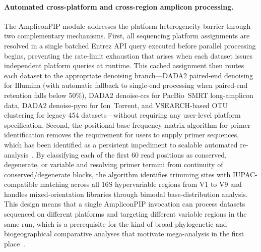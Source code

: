 \paragraph{Automated cross-platform and cross-region amplicon processing.}
The AmpliconPIP module addresses the platform heterogeneity barrier through two
complementary mechanisms.
First, all sequencing platform assignments are resolved in a single batched Entrez
API query executed before parallel processing begins, preventing the rate-limit
exhaustion that arises when each dataset issues independent platform queries at
runtime.
This cached assignment then routes each dataset to the appropriate denoising
branch---DADA2 paired-end denoising for Illumina (with automatic fallback to
single-end processing when paired-end retention falls below 50\%), DADA2 denoise-ccs
for PacBio~SMRT long-amplicon data, DADA2 denoise-pyro for Ion~Torrent, and
VSEARCH-based OTU clustering for legacy 454 datasets---without requiring any
user-level platform specification.
Second, the positional base-frequency matrix algorithm for primer identification
removes the requirement for users to supply primer sequences, which has been
identified as a persistent impediment to scalable automated re-analysis~\citep{regueira2023critical}.
By classifying each of the first 60 read positions as conserved, degenerate, or
variable and resolving primer termini from continuity of conserved/degenerate blocks,
the algorithm identifies trimming sites with IUPAC-compatible matching across all 16S
hypervariable regions from V1 to V9 and handles mixed-orientation libraries through
bimodal base-distribution analysis.
This design means that a single AmpliconPIP invocation can process datasets sequenced
on different platforms and targeting different variable regions in the same run,
which is a prerequisite for the kind of broad phylogenetic and biogeographical
comparative analyses that motivate mega-analysis in the first place~\citep{xie2024global,cheng2025host}.

